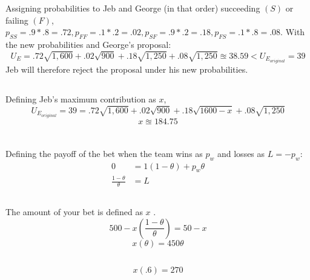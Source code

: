 \documentclass{article}
\begin{document}
		Assigning probabilities to Jeb and George (in that order) succeeding $(S)$ or failing $(F)$, $ p_{SS} = .9 * .8 = .72, p_{FF} =.1 * .2 = .02, p_{SF} = .9 * .2 = .18, p_{FS} = .1*.8 = .08 $. With the new probabilities and George's proposal:
		$$ U_E = .72 \sqrt{1,600} + .02 \sqrt{900} + .18 \sqrt{1,250} + .08 \sqrt{1,250} \approxeq 38.59 < U_{E_{original}} =39 $$
		Jeb will therefore reject the proposal under his new probabilities.
	\subsection[d]{}
		Defining Jeb's maximum contribution as $x$,
		$$U_{E_{original}} = 39 = 	.72 \sqrt{1,600} + .02 \sqrt{900} + .18 \sqrt{1600 - x} + .08 \sqrt{1,250} $$
		$$ x \approxeq 184.75 $$

\section[7]{}
	\subsection[a]{}
		Defining the payoff of the bet when the team wins as $p_w$ and losses as $L=-p_w$:
		\setcounter{equation}{0}
		\begin{align}
			0 &= 1(1-\theta)+p_w \theta \\
			\frac{1-\theta}{\theta} &= L
		\end{align}
	\subsection[b]{}
		The amount of your bet is defined as $x$ .
		$$ 500 - x \left ( \frac{1-\theta}{\theta}  \right ) = 50-x$$
		$$ x(\theta) = 450\theta $$
	\subsection[d]{}
		$$ x(.6) = 270 $$
			
			
			
\end{document}
